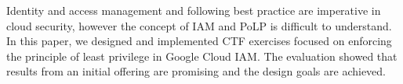 \noindent Identity and access management and following best practice are imperative in cloud security, however the concept of IAM and PoLP is difficult to understand. In this paper, we designed and implemented CTF exercises focused on enforcing the principle of least privilege in Google Cloud IAM. The evaluation showed that results from an initial offering are promising and the design goals are achieved. 